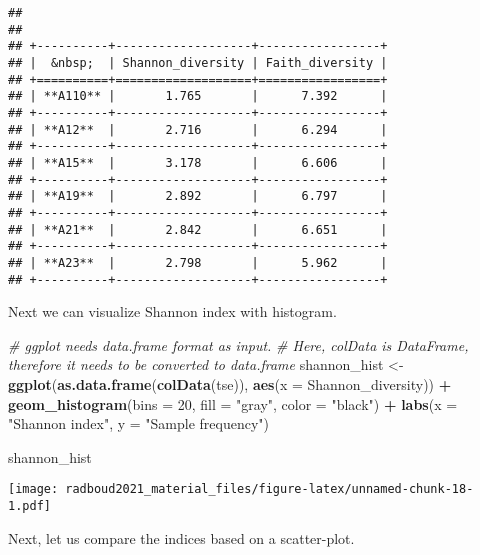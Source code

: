 \documentclass[
  oneside]{book}
\newenvironment{Shaded}{\begin{snugshade}}{\end{snugshade}}
\newcommand{\CommentTok}[1]{\textcolor[rgb]{0.56,0.35,0.01}{\textit{#1}}}
\newcommand{\DataTypeTok}[1]{\textcolor[rgb]{0.13,0.29,0.53}{#1}}
\newcommand{\DecValTok}[1]{\textcolor[rgb]{0.00,0.00,0.81}{#1}}
\newcommand{\KeywordTok}[1]{\textcolor[rgb]{0.13,0.29,0.53}{\textbf{#1}}}
\newcommand{\NormalTok}[1]{#1}
\newcommand{\OperatorTok}[1]{\textcolor[rgb]{0.81,0.36,0.00}{\textbf{#1}}}
\newcommand{\StringTok}[1]{\textcolor[rgb]{0.31,0.60,0.02}{#1}}
\begin{document}
\begin{verbatim}
## 
## 
## +----------+-------------------+-----------------+
## |  &nbsp;  | Shannon_diversity | Faith_diversity |
## +==========+===================+=================+
## | **A110** |       1.765       |      7.392      |
## +----------+-------------------+-----------------+
## | **A12**  |       2.716       |      6.294      |
## +----------+-------------------+-----------------+
## | **A15**  |       3.178       |      6.606      |
## +----------+-------------------+-----------------+
## | **A19**  |       2.892       |      6.797      |
## +----------+-------------------+-----------------+
## | **A21**  |       2.842       |      6.651      |
## +----------+-------------------+-----------------+
## | **A23**  |       2.798       |      5.962      |
## +----------+-------------------+-----------------+
\end{verbatim}

Next we can visualize Shannon index with histogram.

\begin{Shaded}
\begin{Highlighting}[]
\CommentTok{# ggplot needs data.frame format as input.}
\CommentTok{# Here, colData is DataFrame, therefore it needs to be converted to data.frame}
\NormalTok{shannon_hist <-}\StringTok{ }\KeywordTok{ggplot}\NormalTok{(}\KeywordTok{as.data.frame}\NormalTok{(}\KeywordTok{colData}\NormalTok{(tse)), }
                       \KeywordTok{aes}\NormalTok{(}\DataTypeTok{x =}\NormalTok{ Shannon_diversity)) }\OperatorTok{+}\StringTok{ }
\StringTok{  }\KeywordTok{geom_histogram}\NormalTok{(}\DataTypeTok{bins =} \DecValTok{20}\NormalTok{, }\DataTypeTok{fill =} \StringTok{"gray"}\NormalTok{, }\DataTypeTok{color =} \StringTok{"black"}\NormalTok{) }\OperatorTok{+}
\StringTok{  }\KeywordTok{labs}\NormalTok{(}\DataTypeTok{x =} \StringTok{"Shannon index"}\NormalTok{, }\DataTypeTok{y =} \StringTok{"Sample frequency"}\NormalTok{)}

\NormalTok{shannon_hist}
\end{Highlighting}
\end{Shaded}

\texttt{[image: radboud2021\_material\_files/figure-latex/unnamed-chunk-18-1.pdf]}

Next, let us compare the indices based on a scatter-plot.
\end{document}
